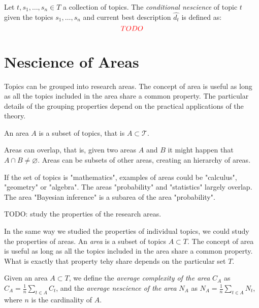 \begin{definition}
Let $t, s_1, \ldots, s_n \in T$ a collection of topics. The \emph{conditional nescience} of topic $t$ given the topics $s_1, \ldots, s_n$ and current best description $\hat{d_t}$ is defined as: 
\[
{\color{red} TODO}
\]
\end{definition}

%
%

\section{Nescience of Areas}
\label{sec:nescience_areas}

Topics can be grouped into research areas. The concept of area is useful as long as all the topics included in the area share a common property. The particular details of the grouping properties depend on the practical applications of the theory.

\begin{definition}
An area $A$ is a subset of topics, that is $A \subset \mathcal{T}$.
\end{definition}

Areas can overlap, that is, given two areas $A$ and $B$ it might happen that $A \cap B \neq \varnothing$. Areas can be subsets of other areas, creating an hierarchy of areas.

\begin{example}
If the set of topics is "mathematics", examples of areas could be "calculus", "geometry" or "algebra". The areas "probability" and "statistics" largely overlap. The area "Bayesian inference" is a subarea of the area "probability".
\end{example}

{\color{red} TODO: study the properties of the research areas.}

In the same way we studied the properties of individual topics, we could study the properties of areas. An \emph{area} is a subset of topics $A\subset T$. The concept of area is useful as long as all the topics included in the area share a common property. What is exactly that property tehy share depends on the particular set $T$.

\begin{definition}
Given an area $A\subset T$, we define the \emph{average complexity of the area} $C_{A}$ as $C_{A}=\frac{1}{n}\sum_{t\in A}C_{t}$, and the \emph{average nescience of the area} $N_{A}$ as $N_{A}=\frac{1}{n}\sum_{t\in A}N_{t}$, where $n$ is the cardinality of $A$.
\end{definition}

